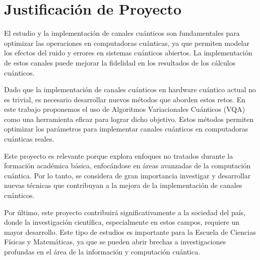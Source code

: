 \section{Justificación de Proyecto}
El estudio y la implementación de canales cuánticos son fundamentales para optimizar las operaciones en computadoras cuánticas, ya que permiten modelar los efectos del ruido y errores en sistemas cuánticos abiertos. La implementación de estos canales puede mejorar la fidelidad en los resultados de los cálculos cuánticos.

Dado que la implementación de canales cuánticos en hardware cuántico actual no es trivial, es necesario desarrollar nuevos métodos que aborden estos retos. En este trabajo proponemos el uso de Algoritmos Variacionales Cuánticos (VQA) como una herramienta eficaz para lograr dicho objetivo. Estos métodos permiten optimizar los parámetros para implementar canales cuánticos en computadoras cuánticas reales.

Este proyecto es relevante porque explora enfoques no tratados durante la formación académica básica, enfocándose en áreas avanzadas de la computación cuántica. Por lo tanto, se considera de gran importancia investigar y desarrollar nuevas técnicas que contribuyan a la mejora de la implementación de canales cuánticos. 

Por último, este proyecto contribuirá significativamente a la sociedad del país, donde la investigación científica, especialmente en estos campos, requiere un mayor desarrollo. Este tipo de estudios es importante para la Escuela de Ciencias Físicas y Matemáticas, ya que se pueden abrir brechas a investigaciones profundas en el área de la información y computación cuántica.
